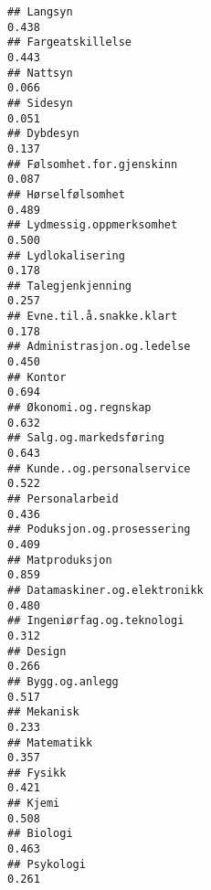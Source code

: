 \documentclass[
]{article}
\begin{document}
\begin{verbatim}
## Langsyn                                                                          0.438
## Fargeatskillelse                                                                 0.443
## Nattsyn                                                                          0.066
## Sidesyn                                                                          0.051
## Dybdesyn                                                                         0.137
## Følsomhet.for.gjenskinn                                                          0.087
## Hørselfølsomhet                                                                  0.489
## Lydmessig.oppmerksomhet                                                          0.500
## Lydlokalisering                                                                  0.178
## Talegjenkjenning                                                                 0.257
## Evne.til.å.snakke.klart                                                          0.178
## Administrasjon.og.ledelse                                                        0.450
## Kontor                                                                           0.694
## Økonomi.og.regnskap                                                              0.632
## Salg.og.markedsføring                                                            0.643
## Kunde..og.personalservice                                                        0.522
## Personalarbeid                                                                   0.436
## Poduksjon.og.prosessering                                                        0.409
## Matproduksjon                                                                    0.859
## Datamaskiner.og.elektronikk                                                      0.480
## Ingeniørfag.og.teknologi                                                         0.312
## Design                                                                           0.266
## Bygg.og.anlegg                                                                   0.517
## Mekanisk                                                                         0.233
## Matematikk                                                                       0.357
## Fysikk                                                                           0.421
## Kjemi                                                                            0.508
## Biologi                                                                          0.463
## Psykologi                                                                        0.261

\end{verbatim}
\end{document}
